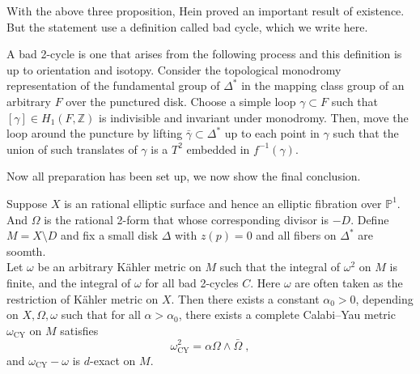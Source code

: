 With the above three proposition, Hein proved an important result of existence. But the statement use a definition called bad cycle, which we write here.
\begin{defi}
A bad 2-cycle is one that arises from the following process and this definition is up to orientation and isotopy. Consider the topological monodromy representation of the fundamental group of $\Delta^*$ in the mapping class group of an arbitrary $F$ over the punctured disk. Choose a simple loop $\gamma\subset F$ such that $[\gamma]\in H_1(F,\mathbb{Z})$ is indivisible and invariant under monodromy. Then, move the loop around the puncture by lifting $\bar{\gamma}\subset \Delta^*$ up to each point in $\gamma$ such that the union of such translates of $\gamma$ is a $T^2$ embedded in $f^{-1}(\gamma)$. 
\end{defi}
Now all preparation has been set up, we now show the final conclusion.
\begin{prop}
Suppose $X$ is an rational elliptic surface and hence an elliptic fibration over $\mathbb{P}^1$. And $\Omega$ is the rational 2-form that whose corresponding divisor is $-D$. Define $M=X\setminus D$ and fix a small disk $\Delta$ with $z(p)=0$ and all fibers on $\Delta^*$ are soomth.\\ \indent
Let $\omega$ be an arbitrary K{\"a}hler metric on $M$ such that the integral of $\omega^2$ on $M$ is finite, and the integral of $\omega$ for all bad 2-cycles $C$. Here $\omega$ are often taken as the restriction of K{\"a}hler metric on $X$. Then there exists a constant $\alpha_0>0$, depending on $X,\Omega,\omega$ such that for all $\alpha>\alpha_0$, there exists a complete Calabi--Yau metric $\omega_{\textrm{CY}}$ on $M $ satisfies
$$\omega_{\textrm{CY}}^2=\alpha\Omega\wedge \bar{\Omega}\; ,$$
and $\omega_{\textrm{CY}}-\omega$ is $d$-exact on $M$.
\end{prop}